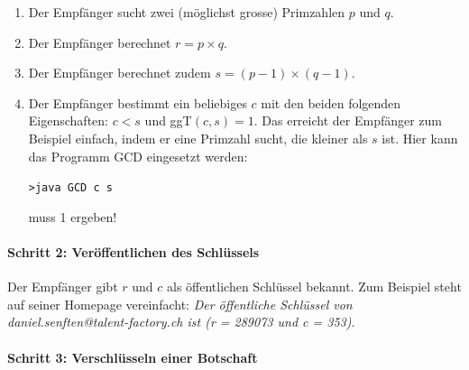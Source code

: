 \renewcommand{\theenumi}{\alph{enumi}}
\begin{enumerate}[label={\alph*)}]
    \item Der Empfänger sucht zwei (möglichst grosse) Primzahlen $p$ und $q$.
    \item Der Empfänger berechnet $r = p\times q$.
    \item Der Empfänger berechnet zudem $s = (p − 1) \times (q − 1)$.
    \item Der Empfänger bestimmt ein beliebiges $c$ mit den beiden folgenden
    Eigenschaften: $c < s$ und ggT$(c, s) = 1$. Das erreicht der Empfänger
    zum Beispiel einfach, indem er eine Primzahl sucht, die kleiner als $s$
    ist. Hier kann das Programm GCD eingesetzt werden:

    \begin{center}
        \texttt{>java GCD c s}
    \end{center}

    muss 1 ergeben!
\end{enumerate}


\paragraph*{Schritt 2: Veröffentlichen des Schlüssels}
Der Empfänger gibt $r$ und $c$ als öffentlichen Schlüssel bekannt.
Zum Beispiel steht auf seiner Homepage vereinfacht: \emph{Der öffentliche
Schlüssel von daniel.senften@talent-factory.ch ist (r = 289073 und c = 353)}.

\paragraph*{Schritt 3: Verschlüsseln einer Botschaft}


